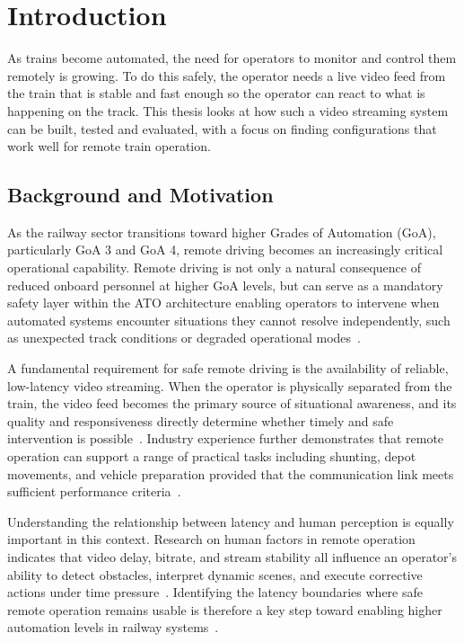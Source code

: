 \section{Introduction}
As trains become automated, the need for operators to monitor and control them remotely is growing. To do this safely, the operator needs a live video feed from the train that is stable and fast enough so the operator can react to what is happening on the track. This thesis looks at how such a video streaming system can be built, tested and evaluated, with a focus on finding configurations that work well for remote train operation.

\subsection{Background and Motivation}
As the railway sector transitions toward higher Grades of Automation (GoA), particularly GoA 3 and GoA 4, remote driving becomes an increasingly critical operational capability. Remote driving is not only a natural consequence of reduced onboard personnel at higher GoA levels, but can serve as a mandatory safety layer within the ATO architecture enabling operators to intervene when automated systems encounter situations they cannot resolve independently, such as unexpected track conditions or degraded operational modes~\cite{orr2024, europesrail2025_d3}.

A fundamental requirement for safe remote driving is the availability of reliable, low-latency video streaming. When the operator is physically separated from the train, the video feed becomes the primary source of situational awareness, and its quality and responsiveness directly determine whether timely and safe intervention is possible~\cite{mejias2024, myhrvold2025}. Industry experience further demonstrates that remote operation can support a range of practical tasks including shunting, depot movements, and vehicle preparation provided that the communication link meets sufficient performance criteria~\cite{fp2r2dato2023d5_4}.

Understanding the relationship between latency and human perception is equally important in this context. Research on human factors in remote operation indicates that video delay, bitrate, and stream stability all influence an operator's ability to detect obstacles, interpret dynamic scenes, and execute corrective actions under time pressure~\cite{brandenburger2023, neumeier2019}. Identifying the latency boundaries where safe remote operation remains usable is therefore a key step toward enabling higher automation levels in railway systems~\cite{myhrvold2025}.

